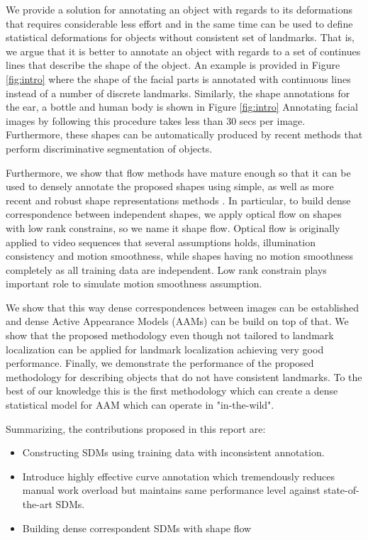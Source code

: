 We provide a solution for annotating an object with regards to its deformations that requires considerable less effort and in the same time can be used to define statistical deformations for objects without consistent set of landmarks. That is, we argue that it is better to annotate an object with regards to a set of continues lines that describe the shape of the object. An example is provided in Figure \ref{fig:intro} where the shape of the facial parts is annotated with continuous lines instead of a number of discrete landmarks. Similarly, the shape annotations for the ear, a bottle and human body is shown in Figure \ref{fig:intro} Annotating facial images by following this procedure takes less than 30 secs per image. Furthermore, these shapes can be automatically produced by recent methods that perform discriminative segmentation of objects. 

Furthermore, we show that flow methods have mature enough so that it can be used to densely annotate the proposed shapes using simple, as well as more recent and robust shape representations methods \cite{Garg2013,Nguyen2013}.  In particular, to build dense correspondence between independent shapes, we apply optical flow on shapes with low rank constrains, so we name it shape flow. Optical flow is originally applied to video sequences that several assumptions holds, illumination consistency and motion smoothness, while shapes having no motion smoothness completely as all training data are independent. Low rank constrain plays important role to simulate motion smoothness assumption. 

We show that this way dense correspondences between images can be established and dense Active Appearance Models (AAMs) can be build on top of that. We show that the proposed methodology even though not tailored to landmark localization can be applied for landmark localization achieving very good performance. Finally, we demonstrate the performance of the proposed methodology for describing objects that do not have consistent landmarks. To the best of our knowledge this is the first methodology which can create a dense statistical model for AAM which can operate in "in-the-wild".



Summarizing, the contributions proposed in this report are:
\begin{itemize}
  \item Constructing SDMs using training data with inconsistent annotation.
  \item Introduce highly effective curve annotation which tremendously reduces manual work overload but maintains same performance level against state-of-the-art SDMs.
  \item Building dense correspondent SDMs with shape flow
\end{itemize}
